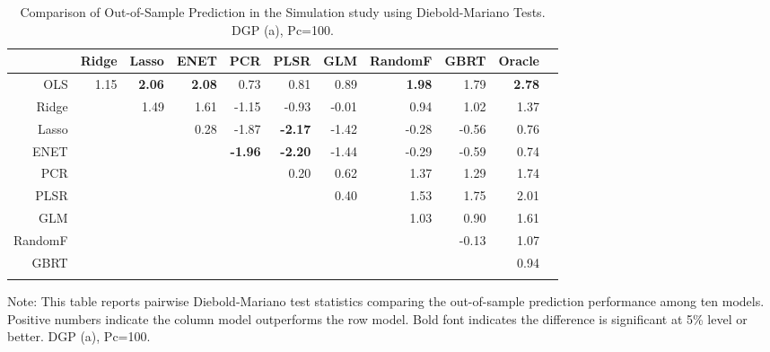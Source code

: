 \documentclass[11pt]{article}
\begin{document}
\begin{table}[H]
\begin{threeparttable}
\centering
\setlength{\tabcolsep}{5pt}
\caption{Comparison of Out-of-Sample Prediction in the Simulation study using Diebold-Mariano Tests. DGP (a), Pc=100.}
\centering
\begin{tabular}{r|rrrrrrrrrr}
  \Xhline{2\arrayrulewidth}
& Ridge & Lasso & ENET & PCR & PLSR & GLM & RandomF & GBRT & Oracle \\ 
  \hline
OLS  & 1.15 & \textbf{2.06} & \textbf{2.08} & 0.73 & 0.81 & 0.89 & \textbf{1.98} & 1.79 & \textbf{2.78} \\ 
  Ridge  && 1.49 & 1.61 & -1.15 & -0.93 & -0.01 & 0.94 & 1.02 & 1.37 \\ 
  Lasso &&& 0.28 & -1.87 & \textbf{-2.17} & -1.42 & -0.28 & -0.56 & 0.76 \\ 
  ENET  &&&& \textbf{-1.96} & \textbf{-2.20} & -1.44 & -0.29 & -0.59 & 0.74 \\ 
  PCR  &&&&& 0.20 & 0.62 & 1.37 & 1.29 & 1.74 \\ 
  PLSR  &&&&&& 0.40 & 1.53 & 1.75 & 2.01 \\ 
  GLM &&&&&&& 1.03 & 0.90 & 1.61 \\ 
  RandomF  &&&&&&&& -0.13 & 1.07 \\ 
  GBRT &&&&&&&&& 0.94 \\ 
   \Xhline{2\arrayrulewidth}
\end{tabular}
\begin{tablenotes}
      \small
      \item Note: This table reports pairwise Diebold-Mariano test statistics comparing the out-of-sample prediction performance among ten models. Positive numbers indicate the column model outperforms the row model. Bold font indicates the difference is significant at 5\% level or better. DGP (a), Pc=100.
    \end{tablenotes}
  \end{threeparttable}
\label{table:dieboldsim2}
\end{table}


\end{document}
